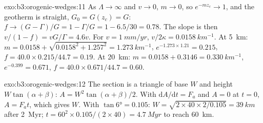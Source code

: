 \begin{solution}{exo:b3:orogenic-wedges:11}
As $\Lambda \to \infty$ and $v \to 0$, $m \to 0$, so $e^{-mz_c} \to 1$, and
the geotherm is straight, $G_0 = G(z_c) = G$: $f \to (G - \Gamma)/G = 1 -
\Gamma/G = 1 - 6.5/30 = 0.78$. The slope is then $v/(1 - f) = vG/\Gamma =
4.6v$. For $v = \qty{1}{mm/yr}$, $v/2\kappa = \qty{0.0158}{km^{-1}}$. At
\qty{5}{km}: $m = 0.0158 + \sqrt{0.0158^2 + 1.257^2} = \qty{1.273}{km^{-1}}$,
$e^{-1.273\times1.21} = 0.215$, $f = 40.0\times0.215/44.7 = 0.19$. At
\qty{20}{km}: $m = 0.0158 + 0.3146 = \qty{0.330}{km^{-1}}$, $e^{-0.399} =
0.671$, $f = 40.0\times0.671/44.7 = 0.60$.
\end{solution}

\begin{solution}{exo:b3:orogenic-wedges:12}
The section is a triangle of base $W$ and height $W\tan(\alpha + \beta)$:
$A = W^2\tan(\alpha + \beta)/2$. With $\mathrm dA/\mathrm dt = F_a$ and $A =
0$ at $t = 0$, $A = F_at$, which gives $W$. With $\tan\ang{6} = 0.105$:
$W = \sqrt{2\times40\times2/0.105} = \qty{39}{km}$ after \qty{2}{Myr}; $t =
60^2\times0.105/(2\times40) = \qty{4.7}{Myr}$ to reach \qty{60}{km}.
\end{solution}

